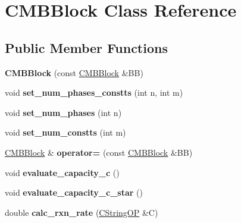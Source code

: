 \hypertarget{class_c_m_b_block}{}\section{C\+M\+B\+Block Class Reference}
\label{class_c_m_b_block}
\subsection*{Public Member Functions}
\begin{DoxyCompactItemize}
\item 
\mbox{\label{class_c_m_b_block_a26280a40bc8819da8321e8495b7d9131}} 
{\bfseries C\+M\+B\+Block} (const \hyperlink{class_c_m_b_block}{C\+M\+B\+Block} \&BB)
\item 
\mbox{\label{class_c_m_b_block_a24cb69d797087397cd58db76bf1efc0f}} 
void {\bfseries set\+\_\+num\+\_\+phases\+\_\+constts} (int n, int m)
\item 
\mbox{\label{class_c_m_b_block_ad956ae410acf9bcf0e4db1553df86b51}} 
void {\bfseries set\+\_\+num\+\_\+phases} (int n)
\item 
\mbox{\label{class_c_m_b_block_a1518d15ae3f5362999772a180f43cbc6}} 
void {\bfseries set\+\_\+num\+\_\+constts} (int m)
\item 
\mbox{\label{class_c_m_b_block_a5b67b1cb6be11f89836ba73284a102ac}} 
\hyperlink{class_c_m_b_block}{C\+M\+B\+Block} \& {\bfseries operator=} (const \hyperlink{class_c_m_b_block}{C\+M\+B\+Block} \&BB)
\item 
\mbox{\label{class_c_m_b_block_ad624a3eb7dcfa0a2dd5c8f6fa020600a}} 
void {\bfseries evaluate\+\_\+capacity\+\_\+c} ()
\item 
\mbox{\label{class_c_m_b_block_a1410071e9b75107a18f01654044db88b}} 
void {\bfseries evaluate\+\_\+capacity\+\_\+c\+\_\+star} ()
\item 
\mbox{\label{class_c_m_b_block_a6335da7c6ff44d7550a7f912c648bf63}} 
double {\bfseries calc\+\_\+rxn\+\_\+rate} (\hyperlink{class_c_string_o_p}{C\+String\+OP} \&C)
\item 

\end{DoxyCompactItemize}
